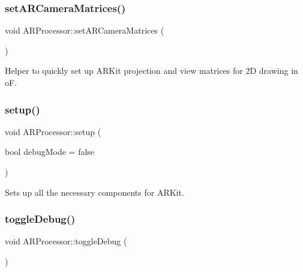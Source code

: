 \mbox{\label{class_a_r_processor_a2ffd8b9518388be29eba6affe4d4d152}} 
\subsubsection{\texorpdfstring{set\+A\+R\+Camera\+Matrices()}{setARCameraMatrices()}}
{\footnotesize\ttfamily void A\+R\+Processor\+::set\+A\+R\+Camera\+Matrices (\begin{DoxyParamCaption}{ }\end{DoxyParamCaption})}



Helper to quickly set up A\+R\+Kit projection and view matrices for 2D drawing in oF. 

\mbox{\label{class_a_r_processor_a1a41547daccb7c6810bc2693ea6d5487}} 
\subsubsection{\texorpdfstring{setup()}{setup()}}
{\footnotesize\ttfamily void A\+R\+Processor\+::setup (\begin{DoxyParamCaption}\item[{bool}]{debug\+Mode = {\ttfamily false} }\end{DoxyParamCaption})}



Sets up all the necessary components for A\+R\+Kit. 

\mbox{\label{class_a_r_processor_a832585774cbeb04cc181f01c193940b5}} 
\subsubsection{\texorpdfstring{toggle\+Debug()}{toggleDebug()}}
{\footnotesize\ttfamily void A\+R\+Processor\+::toggle\+Debug (\begin{DoxyParamCaption}{ }\end{DoxyParamCaption})\hspace{0.3cm}{\ttfamily [inline]}}


